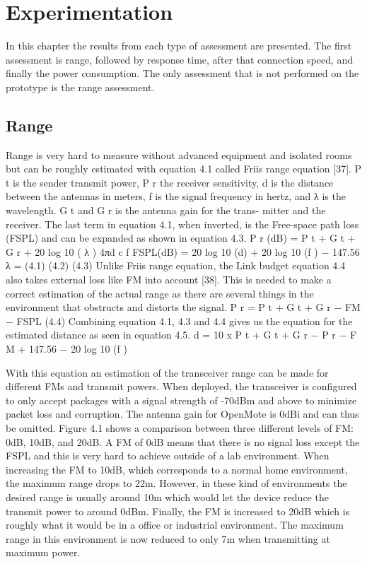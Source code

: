 \section{Experimentation} \label{sec:Experimentation}

In this chapter the results from each type of assessment are presented.
The first assessment is range,
	followed by response time,
	after that connection speed,
	and finally the power consumption.
The only assessment that is not performed on the prototype is the range assessment.

\subsection{Range}
Range is very hard to measure without advanced equipment and isolated
rooms but can be roughly estimated with equation 4.1 called Friis range
equation [37]. P t is the sender transmit power, P r the receiver sensitivity, d
is the distance between the antennas in meters, f is the signal frequency in
hertz, and λ is the wavelength. G t and G r is the antenna gain for the trans-
mitter and the receiver. The last term in equation 4.1, when inverted, is the
Free-space path loss (FSPL) and can be expanded as shown in equation 4.3.
P r (dB) = P t + G t + G r + 20 log 10 (
λ
)
4πd
c
f
FSPL(dB) = 20 log 10 (d) + 20 log 10 (f ) − 147.56
λ =
(4.1)
(4.2)
(4.3)
Unlike Friis range equation, the Link budget equation 4.4 also takes external
loss like FM into account [38]. This is needed to make a correct estimation of
the actual range as there are several things in the environment that obstructs
and distorts the signal.
P r = P t + G t + G r − FM − FSPL
(4.4)
Combining equation 4.1, 4.3 and 4.4 gives us the equation for the estimated
distance as seen in equation 4.5.
d = 10 x
P t + G t + G r − P r − F M + 147.56 − 20 log 10 (f )


With this equation an estimation of the transceiver range can be made for different FMs and transmit powers.
When deployed,
	the transceiver is configured to only accept packages with a signal strength of -70dBm and above to minimize packet loss and corruption.
The antenna gain for OpenMote is 0dBi and can thus be omitted.
Figure 4.1 shows a comparison between three different levels of FM: 0dB, 10dB,
	and 20dB.
A FM of 0dB means that there is no signal loss except the FSPL and this is very hard to achieve outside of a lab environment.
When increasing the FM to 10dB,
	which corresponds to a normal home environment,
	the maximum range drops to 22m.
However,
	in these kind of environments the desired range is usually around 10m which would let the device reduce the transmit power to around 0dBm.
Finally,
	the FM is increased to 20dB which is roughly what it would be in a office or industrial environment.
The maximum range in this environment is now reduced to only 7m when transmitting at maximum power.

